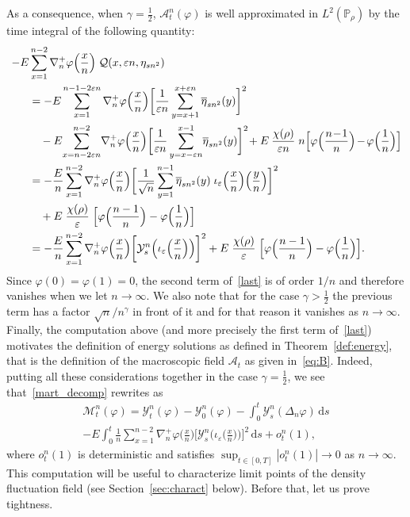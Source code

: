\documentclass[AHL,Unicode,longabstracts]{cedram}
\newcommand{\bb}[1]{{\mathbb #1}}
\newcommand{\mc}[1]{{\mathcal #1}}
\renewcommand{\mc}[1]{{\mathcal #1}}
\newcommand{\pfrac}[2]{\genfrac{}{}{}{1}{#1}{#2}}
\renewcommand{\bar}{\overline}
\newcommand*{\dd}{\mathrm{d}}
\newcommand*{\ds}{\dd s}
\newcommand*{\Mk}{\mkern -2mu}
\renewcommand{\pfrac}{\frac}
\begin{document}
As a consequence, when $\gamma=\frac12$, $\mc A_t^n(\varphi)$ is well approximated in $ L^2(\bb P_\rho)$ by the time integral of the following quantity:
\begin{align}
-E&\sum_{x=1}^{n-2} \nabla_n^+ \varphi\Big(\pfrac{x}{n}\Big)\; \mc Q(x,\varepsilon n,\eta_{sn^2})\notag\\
& = -E\sum_{x=1}^{n-1-2\varepsilon n}\nabla_n^+\varphi\Big(\pfrac{x}{n}\Big) \bigg[\frac{1}{\varepsilon n} \sum_{y=x+1}^{x+\varepsilon n} \bar\eta_{sn^2}(y)\bigg]^2 \notag \\
& \quad -E \!\sum_{x=n-2\varepsilon n}^{n-2}\!\nabla_n^+\varphi\Big(\pfrac{x}{n}\Big) \bigg[\frac{1}{\varepsilon n} \sum_{y=x-\varepsilon n}^{x-1} \!\bar\eta_{sn^2}(y)\bigg]^2 \!+E\:\frac{\chi(\rho)}{\varepsilon n} \; n \Big[\varphi\Big(\pfrac{n\!-\!1}{n}\Big)\Mk-\Mk\varphi\Big(\pfrac{1}{n}\Big)\Big] \notag\!\\
& =- \frac{E}{n}\sum_{x=1}^{n-2} \nabla_n^+ \varphi\Big(\pfrac{x}{n}\Big)\bigg[\frac{1}{\sqrt n} \sum_{y=1}^{n-1} \bar\eta_{sn^2}(y)\; \iota_\varepsilon\Big(\pfrac{x}{n}\Big)\Big(\pfrac{y}{n}\Big)\bigg]^2 \notag \\
& \quad +E \;\frac{\chi(\rho)}{\varepsilon } \; \Big[\varphi\Big(\pfrac{n-1}{n}\Big)-\varphi\Big(\pfrac{1}{n}\Big)\Big]\notag \\
& = -\frac{E}{n}\sum_{x=1}^{n-2} \nabla_n^+\varphi\Big(\pfrac{x}{n}\Big) \bigg[\mc Y^n_s\Big(\iota_\varepsilon\Big(\pfrac{x}{n}\Big)\Big)\bigg]^2 +E \;\frac{\chi(\rho)}{\varepsilon } \; \Big[\varphi\Big(\pfrac{n-1}{n}\Big)-\varphi\Big(\pfrac{1}{n}\Big)\Big]. \label{last}
\end{align}
Since $\varphi(0)=\varphi(1)=0$, the second term of~\eqref{last} is of order $1/n$ and therefore vanishes when we let $n\to \infty$. We also note that for the case $\gamma>\frac12$ the previous term has a factor $\sqrt n/n^\gamma$ in front of it and for that reason it vanishes as $n\to\infty$. Finally, the computation above (and more precisely the first term of~\eqref{last}) motivates the definition of energy solutions as defined in Theorem~\ref{def:energy}, that is the definition of the macroscopic field $\mc A_t$ as given in~\eqref{eq:B}. Indeed, putting all these considerations together in the case $\gamma=\frac12$, we see that~\eqref{mart_decomp} rewrites as
\begin{multline}
\mc M_t^n(\varphi)=\mc Y_t^n(\varphi) - \mc Y_0^n(\varphi) - \int_0^t \mc Y_s^n(\Delta_n\varphi) \,\ds \\
- E \int_0^t \frac{1}{n}\sum_{x=1}^{n-2} \nabla_n^+\varphi\big(\pfrac{x}{n}\big) \bigg[\mc Y_s^n\Big(\iota_\varepsilon\big(\pfrac{x}{n}\big)\Big)\bigg]^2 \,\ds + o^n_t(1), \label{eq:mart_2}
\end{multline}
where $o^n_t(1)$ is deterministic and satisfies $\sup_{t \in [0,T]} |o^n_t(1)| \to 0$ as $n \to \infty$. This computation will be useful to characterize limit points of the density fluctuation field (see Section~\ref{sec:charact} below). Before that, let us prove tightness.
\end{document}

